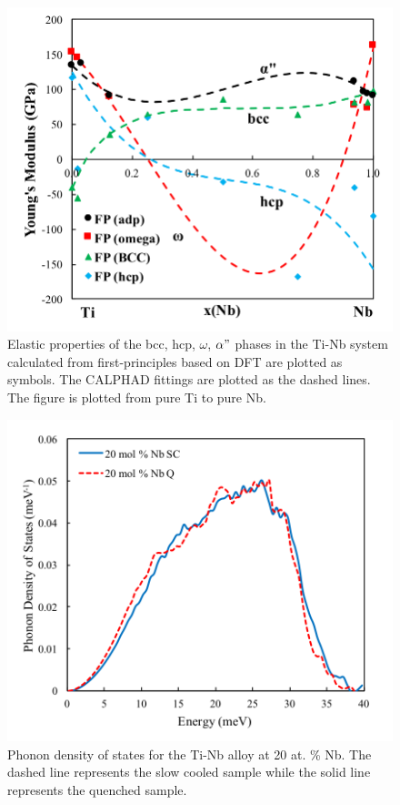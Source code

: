 \pagebreak
\begin{figure}[H]
	\centering
	\includegraphics[width=\textwidth]{Chapter-7/Figures/tinbelastic.png}
	\caption{Elastic properties of the bcc, hcp, $\omega$, $\alpha"$ phases in the Ti-Nb system calculated from first-principles based on DFT are plotted as symbols. The CALPHAD fittings are plotted as the dashed lines. The figure is plotted from pure Ti to pure Nb.}
	\label{Ch7-figure:tinbelastic}
\end{figure}

\pagebreak
\begin{figure}[H]
	\centering
	\includegraphics[width=\textwidth]{Chapter-7/Figures/50dos20.png}
	\caption{Phonon density of states for the Ti-Nb alloy at 20 at. \% Nb. The dashed line represents the slow cooled sample while the solid line represents the quenched sample.}
	\label{Ch7-figure:50dos20}
\end{figure}

